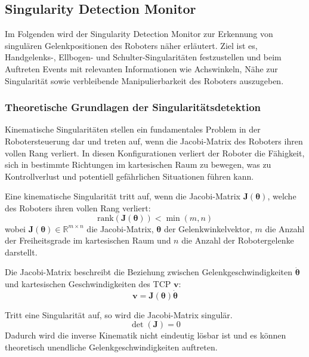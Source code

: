 \subsection{Singularity Detection Monitor} \label{ssec:Singularitaeten}
Im Folgenden wird der Singularity Detection Monitor zur Erkennung von
singulären Gelenkpositionen des Roboters näher erläutert. Ziel ist es,
Handgelenks-, Ellbogen- und Schulter-Singularitäten festzustellen und beim
Auftreten Events mit relevanten Informationen wie Achswinkeln, Nähe zur
Singularität sowie verbleibende Manipulierbarkeit des Roboters auszugeben.

\subsubsection{Theoretische Grundlagen der Singularitätsdetektion}
\label{sssec:Theorie_Singularitaeten}
Kinematische Singularitäten stellen ein fundamentales Problem in der
Robotersteuerung dar und treten auf, wenn die Jacobi-Matrix des Roboters ihren
vollen Rang verliert. In diesen Konfigurationen verliert der Roboter die
Fähigkeit, sich in bestimmte Richtungen im kartesischen Raum zu bewegen, was zu
Kontrollverlust und potentiell gefährlichen Situationen führen
kann.

Eine kinematische Singularität tritt auf,
wenn die Jacobi-Matrix $\mathbf{J}(\boldsymbol{\theta})$, welche des Roboters
ihren vollen Rang verliert:
\begin{equation}
  \text{rank}(\mathbf{J}(\boldsymbol{\theta})) < \min(m, n)
  \label{eq:singularity_condition}
\end{equation} wobei
$\mathbf{J}(\boldsymbol{\theta}) \in \mathbb{R}^{m \times n}$ die Jacobi-Matrix,
$\boldsymbol{\theta}$ der Gelenkwinkelvektor, $m$ die Anzahl der Freiheitsgrade
im kartesischen Raum und $n$ die Anzahl der Robotergelenke darstellt.
 
Die Jacobi-Matrix beschreibt die Beziehung zwischen Gelenkgeschwindigkeiten
$\dot{\boldsymbol{\theta}}$ und kartesischen Geschwindigkeiten des TCP
$\mathbf{v}$:
\begin{equation} \mathbf{v} = \mathbf{J}(\boldsymbol{\theta})
  \dot{\boldsymbol{\theta}} \label{eq:jacobian_velocity}
\end{equation}
 
Tritt eine Singularität auf, so wird die Jacobi-Matrix singulär.
\begin{equation} \det(\mathbf{J}) = 0 \label{eq:jacobian_singularity}
\end{equation} Dadurch wird die inverse Kinematik nicht
eindeutig lösbar ist und es können theoretisch unendliche
Gelenkgeschwindigkeiten auftreten.

